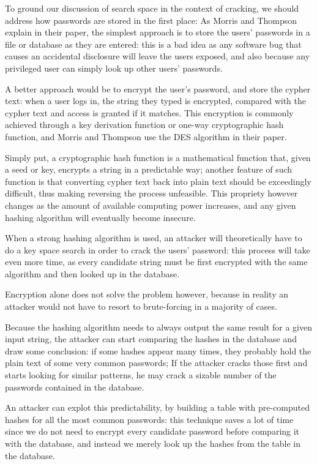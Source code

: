To ground our discussion of search space in the context of cracking, we should address how passwords are stored in the first place: As Morris and Thompson explain in their paper, the simplest approach is to store the users' passwords in a file or database as they are entered: this is a bad idea as any software bug that causes an accidental disclosure will leave the users exposed, and also because any privileged user can simply look up other users' passwords.

A better approach would be to encrypt the user's password, and store the cypher text: when a user logs in, the string they typed is encrypted, compared with the cypher text and access is granted if it matches. This encryption is commonly achieved through a key derivation function or one-way cryptographic hash function, and Morris and Thompson use the DES algorithm in their paper. %

Simply put, a cryptographic hash function is a mathematical function that, given a seed or key, encrypts a string in a predictable way; another feature of such function is that converting cypher text back into plain text should be exceedingly difficult, thus making reversing the process unfeasible.
This propriety however changes as the amount of available computing power increases, and any given hashing algorithm will eventually become insecure.

When a strong hashing algorithm is used, an attacker will theoretically have to do a key space search in order to crack the users' password: this process will take even more time, as every candidate string must be first encrypted with the same algorithm and then looked up in the database.

Encryption alone does not solve the problem however, because in reality an attacker would not have to resort to brute-forcing in a majority of cases.

Because the hashing algorithm needs to always output the same result for a given input string, the attacker can start comparing the hashes in the database and draw some conclusion: if some hashes appear many times, they probably hold the plain text of some very common passwords; If the attacker cracks those first and starts looking for similar patterns, he may crack a sizable number of the passwords contained in the database.

An attacker can explot this predictability, by building a table with pre-computed hashes for all the most common passwords: this technique saves a lot of time since we do not need to encrypt every candidate password before comparing it with the database, and instead we merely look up the hashes from the table in the database. 

